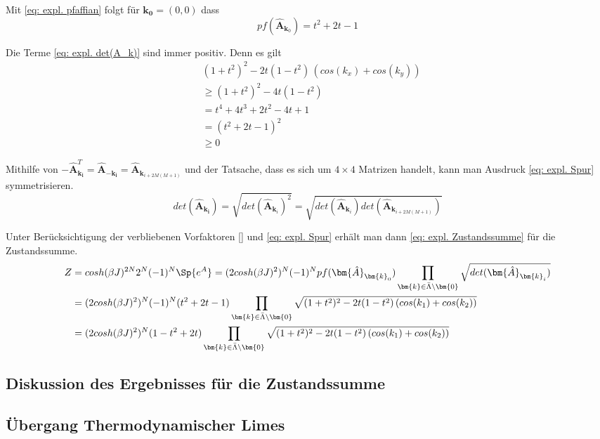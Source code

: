 \noindent Mit \eqref{eq: expl. pfaffian} folgt für $\bm{k_0} = (0,0)$ dass
\begin{equation}
pf(\bm{\hat{A}}_{\bm{k}_0}) = t^2 + 2t -1
\end{equation}

\noindent Die Terme \eqref{eq: expl. det(A_k)} sind immer positiv. Denn es gilt
\begin{align}
&(1+t^2)^2 - 2t(1-t^2)\,(cos(k_x) + cos(k_y)) \nonumber \\
    &\geq (1+t^2)^2 - 4t(1-t^2) \nonumber \\
    &= t^4 + 4t^3 + 2t^2 -4t +1 \nonumber \\
    &= (t^2+2t-1)^2 \label{eq: pf(A_0)^2 = det(A_0)} \\
    &\geq 0 \nonumber
\end{align}

\noindent Mithilfe von $-\bm{\hat{A}}_{\bm{k_i}}^T = \bm{\hat{A}}_{-\bm{k_i}}  = \bm{\hat{A}}_{\bm{k}_{i+2M(M+1)}}$ und der Tatsache, dass es sich um $4\times4$ Matrizen handelt, kann man Ausdruck \eqref{eq: expl. Spur} symmetrisieren.
\begin{equation} \label{eq: sym. det(A_k)}
det(\bm{\hat{A}}_{\bm{k_i}})
    = \sqrt{det(\bm{\hat{A}}_{\bm{k}_i})^2} 
    = \sqrt{det(\bm{\hat{A}}_{\bm{k}_i})det(\bm{\hat{A}}_{\bm{k}_{i+2M(M+1)}})} 
\end{equation}

\noindent Unter Berücksichtigung der verbliebenen Vorfaktoren \eqref{} und \eqref{eq: expl. Spur} erhält  man dann \eqref{eq: expl. Zustandssumme} für die Zustandssumme.
\begin{align}
Z   &= cosh(\beta J)^{2N} 2^N (-1)^N \Sp{e^A} \nonumber = (2cosh(\beta J)^{2} )^N (-1)^N pf(\bm{\hat{A}}_{\bm{k}_0}) \prod_{\bm{k} \in \bar{\Lambda}\setminus{\bm{0}}}  \sqrt{det(\bm{\hat{A}}_{\bm{k}_i})} \nonumber\\
    &= (2cosh(\beta J)^{2} )^N (-1)^N (t^2+2t-1) \prod_{\bm{k} \in \bar{\Lambda}\setminus{\bm{0}}}  \sqrt{(1+t^2)^2 - 2t(1-t^2)\,(cos(k_1) + cos(k_2))} \nonumber\\
    &= (2cosh(\beta J)^{2} )^N (1-t^2+2t) \prod_{\bm{k} \in \bar{\Lambda}\setminus{\bm{0}}}  \sqrt{(1+t^2)^2 - 2t(1-t^2)\,(cos(k_1) + cos(k_2))} \label{eq: expl. Zustandssumme}
\end{align}

\subsection{Diskussion des Ergebnisses für die Zustandssumme}
\subsection{Übergang Thermodynamischer Limes}